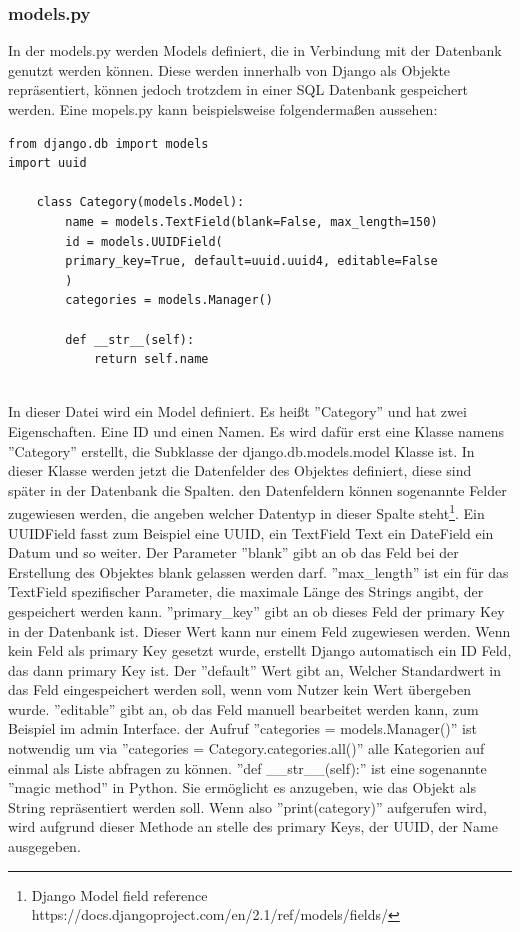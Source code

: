 \documentclass{article}
\begin{document}
\subsubsection{models.py}
In der models.py werden Models definiert, die in Verbindung mit der Datenbank genutzt werden können. Diese werden innerhalb von Django als Objekte repräsentiert, können jedoch trotzdem in einer SQL Datenbank gespeichert werden. Eine mopels.py kann beispielsweise folgendermaßen aussehen:
\begin{verbatim}
from django.db import models
import uuid

	class Category(models.Model):
		name = models.TextField(blank=False, max_length=150)
		id = models.UUIDField(
		primary_key=True, default=uuid.uuid4, editable=False
		)	
		categories = models.Manager()
		
		def __str__(self):
			return self.name
	
\end{verbatim}
In dieser Datei wird ein Model definiert. Es heißt ''Category'' und hat zwei Eigenschaften. Eine ID und einen Namen. Es wird dafür erst eine Klasse namens ''Category'' erstellt, die Subklasse der django.db.models.model Klasse ist. In dieser Klasse werden jetzt die Datenfelder des Objektes definiert, diese sind später in der Datenbank die Spalten. den Datenfeldern können sogenannte Felder zugewiesen werden, die angeben welcher Datentyp in dieser Spalte steht\footnote{ Django Model field reference https://docs.djangoproject.com/en/2.1/ref/models/fields/}. Ein UUIDField fasst zum Beispiel eine UUID, ein TextField Text ein DateField ein Datum und so weiter. Der Parameter ''blank'' gibt an ob das Feld bei der Erstellung des Objektes blank gelassen werden darf. ''max\_length'' ist ein für das TextField spezifischer Parameter, die maximale Länge des Strings angibt, der gespeichert werden kann. ''primary\_key'' gibt an ob dieses Feld der primary Key in der Datenbank ist. Dieser Wert kann nur einem Feld zugewiesen werden. Wenn kein Feld als primary Key gesetzt wurde, erstellt Django  automatisch ein ID Feld, das dann primary Key ist. Der ''default'' Wert gibt an, Welcher Standardwert in das Feld eingespeichert werden soll, wenn vom Nutzer kein Wert übergeben wurde. ''editable'' gibt an, ob das Feld manuell bearbeitet werden kann, zum Beispiel im admin Interface.\newline
der Aufruf ''categories = models.Manager()'' ist notwendig um via ''categories = Category.categories.all()'' alle Kategorien auf einmal als Liste abfragen zu können.\newline
''def \_\_str\_\_(self):'' ist eine sogenannte ''magic method'' in Python. Sie ermöglicht es anzugeben, wie das Objekt als String repräsentiert werden soll. Wenn also ''print(category)'' aufgerufen wird, wird aufgrund dieser Methode an stelle des primary Keys, der UUID, der Name ausgegeben.
\end{document}
